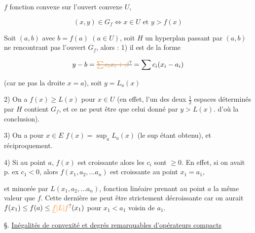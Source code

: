 

$f$ fonction convexe sur l'ouvert convexe $U$,

\[
(x,y)\in G_f\iff x\in U\text{ et } y>f(x)
\]

Soit  $(a,b)$ avec $b=f(a)$ $(a\in U)$,  soit $H$ un hyperplan passant par $(a,b)$ ne rencontrant pas l'ouvert $G_f$, alors : 1) il est de la forme

\[
y-b=\deleted{\unsure{\sum c_i x_i+\beta}}=\sum c_i(x_i-a_i)
\]

(car ne  pas la droite $x=a$), soit $y=L_a(x)$

2) On a $f(x)\geq L(x)$ pour \uline{} $x\in U$ (en effet, l'un des deux  $\frac12$ espaces  déterminés par $H$ contient $G_f$, et ce ne peut être que celui donné par $y>L(x)$.  d'où la conclusion).

3) On a pour $x\in E$ $f(x)=\sup_a L_a(x)$ (le sup étant obtenu), et réciproquement.

4) Si au point $a$, $f(x)$ est croissante alors les $c_i$ sont $\geq0$. En effet, si on avait p. ex $c_1<0$, alors $f(x_1,a_2,\ldots a_n)$ est croissante au point $x_1=a_1$,


et  minorée par $L(x_1,a_2,\ldots a_n)$, fonction linéaire prenant au point $a$ la même valeur que $f$. Cette dernière ne peut être strictement décroissante car on aurait $f(x_1)\leq f(a)\leq\unsure{\underline{f}|L|f}(x_1)$ pour $x_1<a_1$ voisin de $a_1$.


§. \uline{Inégalités de convexité et degrés remarquables d'opérateurs compacts}

